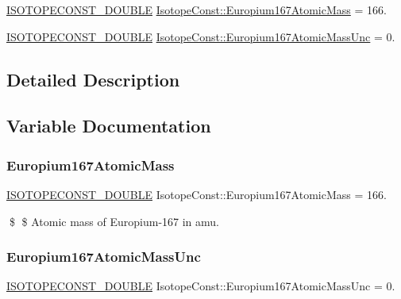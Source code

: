 \begin{DoxyCompactItemize}
\item 
\mbox{\hyperlink{group___isotope_const-_macros_ga8f45a7272ce02c0b4c65c44636ed719a}{I\+S\+O\+T\+O\+P\+E\+C\+O\+N\+S\+T\+\_\+\+D\+O\+U\+B\+LE}} \mbox{\hyperlink{group___isotope_const-_europium-_eu167_gacf6813910c4538e5f14a39f6ebaa3da7}{Isotope\+Const\+::\+Europium167\+Atomic\+Mass}} = 166.
\item 
\mbox{\hyperlink{group___isotope_const-_macros_ga8f45a7272ce02c0b4c65c44636ed719a}{I\+S\+O\+T\+O\+P\+E\+C\+O\+N\+S\+T\+\_\+\+D\+O\+U\+B\+LE}} \mbox{\hyperlink{group___isotope_const-_europium-_eu167_ga2e0bec298ce15062ba233ed091cdddf8}{Isotope\+Const\+::\+Europium167\+Atomic\+Mass\+Unc}} = 0.
\end{DoxyCompactItemize}


\subsection{Detailed Description}


\subsection{Variable Documentation}
\mbox{\label{group___isotope_const-_europium-_eu167_gacf6813910c4538e5f14a39f6ebaa3da7}} 
\subsubsection{\texorpdfstring{Europium167\+Atomic\+Mass}{Europium167AtomicMass}}
{\footnotesize\ttfamily \mbox{\hyperlink{group___isotope_const-_macros_ga8f45a7272ce02c0b4c65c44636ed719a}{I\+S\+O\+T\+O\+P\+E\+C\+O\+N\+S\+T\+\_\+\+D\+O\+U\+B\+LE}} Isotope\+Const\+::\+Europium167\+Atomic\+Mass = 166.}

\$ \$ Atomic mass of Europium-\/167 in amu. \mbox{\label{group___isotope_const-_europium-_eu167_ga2e0bec298ce15062ba233ed091cdddf8}} 
\subsubsection{\texorpdfstring{Europium167\+Atomic\+Mass\+Unc}{Europium167AtomicMassUnc}}
{\footnotesize\ttfamily \mbox{\hyperlink{group___isotope_const-_macros_ga8f45a7272ce02c0b4c65c44636ed719a}{I\+S\+O\+T\+O\+P\+E\+C\+O\+N\+S\+T\+\_\+\+D\+O\+U\+B\+LE}} Isotope\+Const\+::\+Europium167\+Atomic\+Mass\+Unc = 0.}

